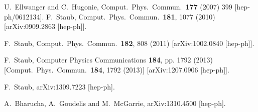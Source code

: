 \documentclass[final,3p,times,pdflatex]{elsarticle}
\begin{document}
\begin{thebibliography}{10}
  U.~Ellwanger and C.~Hugonie,
  Comput.\ Phys.\ Commun.\  {\bf 177} (2007) 399
  [hep-ph/0612134].
  F.~Staub,
  Comput.\ Phys.\ Commun.\  {\bf 181}, 1077 (2010)
  [arXiv:0909.2863 [hep-ph]].

  F.~Staub,
  Comput.\ Phys.\ Commun.\  {\bf 182}, 808 (2011)
  [arXiv:1002.0840 [hep-ph]].

  F.~Staub,
  Computer Physics Communications {\bf 184}, pp. 1792 (2013)
  [Comput.\ Phys.\ Commun.\  {\bf 184}, 1792 (2013)]
  [arXiv:1207.0906 [hep-ph]].

  F.~Staub,
  arXiv:1309.7223 [hep-ph].

  A.~Bharucha, A.~Goudelis and M.~McGarrie,
  arXiv:1310.4500 [hep-ph].


\end{thebibliography}
\end{document}
